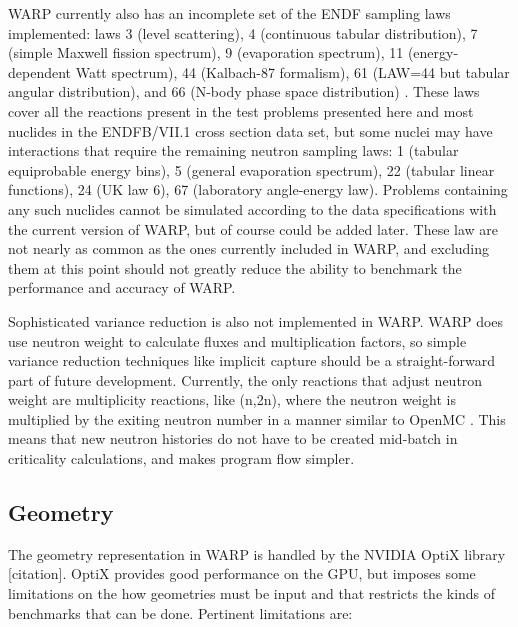 \documentclass[preprint,12pt]{elsarticle}
\begin{document}
WARP currently also has an incomplete set of the ENDF sampling laws implemented: laws 3 (level scattering), 4 (continuous tabular distribution), 7 (simple Maxwell fission spectrum), 9 (evaporation spectrum), 11 (energy-dependent Watt spectrum), 44 (Kalbach-87 formalism), 61 (LAW=44 but tabular angular distribution), and 66 (N-body phase space distribution) \cite{MCNP}.  These laws cover all the reactions present in the test problems presented here and most nuclides in the ENDFB/VII.1 cross section data set, but some nuclei may have interactions that require the remaining neutron sampling laws: 1 (tabular equiprobable energy bins), 5 (general evaporation spectrum), 22 (tabular linear functions), 24 (UK law 6), 67 (laboratory angle-energy law).  Problems containing any such nuclides cannot be simulated according to the data specifications with the current version of WARP, but of course could be added later.  These law are not nearly as common as the ones currently included in WARP, and excluding them at this point should not greatly reduce the ability to benchmark the performance and accuracy of WARP.

Sophisticated variance reduction is also not implemented in WARP.   WARP does use neutron weight to calculate fluxes and multiplication factors, so simple variance reduction techniques like implicit capture should be a straight-forward part of future development. Currently, the only reactions that adjust neutron weight are multiplicity reactions, like (n,2n), where the neutron weight is multiplied by the exiting neutron number in a manner similar to OpenMC \cite{openmc}.  This means that new neutron histories do not have to be created mid-batch in criticality calculations, and makes program flow simpler.  

\subsection{Geometry}

The geometry representation in WARP is handled by the NVIDIA OptiX library [citation].  OptiX provides good performance on the GPU, but imposes some limitations on the how geometries must be input and that restricts the kinds of benchmarks that can be done. Pertinent limitations are:
\end{document}
